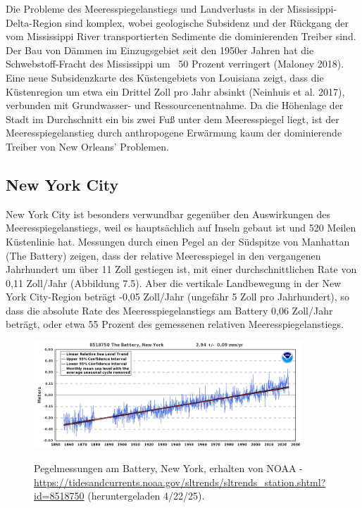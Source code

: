 \documentclass[12pt,paper=a4,DIV=12,parskip=never,chapterprefix=false,headings=standardclasses]{scrreprt}
\begin{document}
Die Probleme des Meeresspiegelanstiegs und Landverlusts in der Mississippi-Delta-Region sind komplex, wobei geologische Subsidenz und der Rückgang der vom Mississippi River transportierten Sedimente die dominierenden Treiber sind. Der Bau von Dämmen im Einzugsgebiet seit den 1950er Jahren hat die Schwebstoff-Fracht des Mississippi um ~50 Prozent verringert (Maloney 2018). Eine neue Subsidenzkarte des Küstengebiets von Louisiana zeigt, dass die Küstenregion um etwa ein Drittel Zoll pro Jahr absinkt (Neinhuis et al. 2017), verbunden mit Grundwasser- und Ressourcenentnahme. Da die Höhenlage der Stadt im Durchschnitt ein bis zwei Fuß unter dem Meeresspiegel liegt, ist der Meeresspiegelanstieg durch anthropogene Erwärmung kaum der dominierende Treiber von New Orleans' Problemen.

\subsection*{New York City}
New York City ist besonders verwundbar gegenüber den Auswirkungen des Meeresspiegelanstiegs, weil es hauptsächlich auf Inseln gebaut ist und 520 Meilen Küstenlinie hat. Messungen durch einen Pegel an der Südspitze von Manhattan (The Battery) zeigen, dass der relative Meeresspiegel in den vergangenen Jahrhundert um über 11 Zoll gestiegen ist, mit einer durchschnittlichen Rate von 0,11 Zoll/Jahr (Abbildung 7.5). Aber die vertikale Landbewegung in der New York City-Region beträgt -0,05 Zoll/Jahr (ungefähr 5 Zoll pro Jahrhundert), so dass die absolute Rate des Meeresspiegelanstiegs am Battery 0,06 Zoll/Jahr beträgt, oder etwa 55 Prozent des gemessenen relativen Meeresspiegelanstiegs.

\begin{figure}[H]
\begin{center}
\includegraphics[width=0.9\textwidth]{bilder/bilderKlima-0072.png}\\[1cm]
\end{center}
\caption{Pegelmessungen am Battery, New York, erhalten von NOAA - \url{https://tidesandcurrents.noaa.gov/sltrends/sltrends_station.shtml?id=8518750} (heruntergeladen 4/22/25).}
\end{figure}
\end{document}

